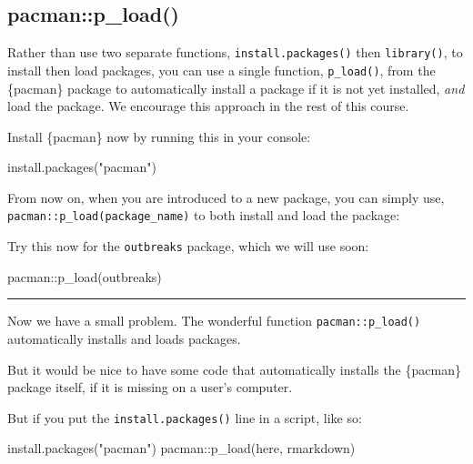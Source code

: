 \documentclass[
  letterpaper,
  DIV=11,
  numbers=noendperiod]{scrreprt}
\newenvironment{Shaded}{\begin{snugshade}}{\end{snugshade}}
\newcommand{\FunctionTok}[1]{\textcolor[rgb]{0.28,0.35,0.67}{#1}}
\newcommand{\NormalTok}[1]{\textcolor[rgb]{0.00,0.23,0.31}{#1}}
\newcommand{\SpecialCharTok}[1]{\textcolor[rgb]{0.37,0.37,0.37}{#1}}
\newcommand{\StringTok}[1]{\textcolor[rgb]{0.13,0.47,0.30}{#1}}
\begin{document}
\subsection{pacman::p\_load()}\label{pacmanp_load}

Rather than use two separate functions, \texttt{install.packages()} then
\texttt{library()}, to install then load packages, you can use a single
function, \texttt{p\_load()}, from the \{pacman\} package to
automatically install a package if it is not yet installed, \emph{and}
load the package. We encourage this approach in the rest of this course.

Install \{pacman\} now by running this in your console:

\begin{Shaded}
\begin{Highlighting}[]
\FunctionTok{install.packages}\NormalTok{(}\StringTok{"pacman"}\NormalTok{)}
\end{Highlighting}
\end{Shaded}

From now on, when you are introduced to a new package, you can simply
use, \texttt{pacman::p\_load(package\_name)} to both install and load
the package:

Try this now for the \texttt{outbreaks} package, which we will use soon:

\begin{Shaded}
\begin{Highlighting}[]
\NormalTok{pacman}\SpecialCharTok{::}\FunctionTok{p\_load}\NormalTok{(outbreaks)}
\end{Highlighting}
\end{Shaded}

\begin{center}\rule{0.5\linewidth}{0.5pt}\end{center}

Now we have a small problem. The wonderful function
\texttt{pacman::p\_load()} automatically installs and loads packages.

But it would be nice to have some code that automatically installs the
\{pacman\} package itself, if it is missing on a user's computer.

But if you put the \texttt{install.packages()} line in a script, like
so:

\begin{Shaded}
\begin{Highlighting}[]
\FunctionTok{install.packages}\NormalTok{(}\StringTok{"pacman"}\NormalTok{)}
\NormalTok{pacman}\SpecialCharTok{::}\FunctionTok{p\_load}\NormalTok{(here, rmarkdown)}
\end{Highlighting}
\end{Shaded}
\end{document}
